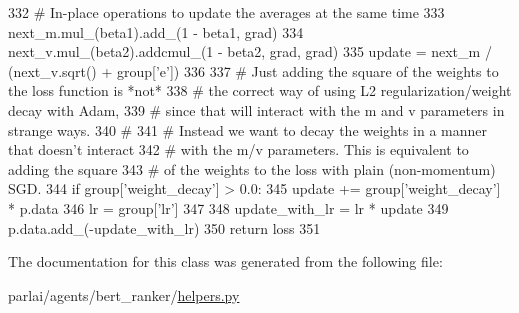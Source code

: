 \begin{DoxyCode}
332                 \textcolor{comment}{# In-place operations to update the averages at the same time}
333                 next\_m.mul\_(beta1).add\_(1 - beta1, grad)
334                 next\_v.mul\_(beta2).addcmul\_(1 - beta2, grad, grad)
335                 update = next\_m / (next\_v.sqrt() + group[\textcolor{stringliteral}{'e'}])
336 
337                 \textcolor{comment}{# Just adding the square of the weights to the loss function is *not*}
338                 \textcolor{comment}{# the correct way of using L2 regularization/weight decay with Adam,}
339                 \textcolor{comment}{# since that will interact with the m and v parameters in strange ways.}
340                 \textcolor{comment}{#}
341                 \textcolor{comment}{# Instead we want to decay the weights in a manner that doesn't interact}
342                 \textcolor{comment}{# with the m/v parameters. This is equivalent to adding the square}
343                 \textcolor{comment}{# of the weights to the loss with plain (non-momentum) SGD.}
344                 \textcolor{keywordflow}{if} group[\textcolor{stringliteral}{'weight\_decay'}] > 0.0:
345                     update += group[\textcolor{stringliteral}{'weight\_decay'}] * p.data
346                 lr = group[\textcolor{stringliteral}{'lr'}]
347 
348                 update\_with\_lr = lr * update
349                 p.data.add\_(-update\_with\_lr)
350         \textcolor{keywordflow}{return} loss
351 \end{DoxyCode}


The documentation for this class was generated from the following file\+:\begin{DoxyCompactItemize}
\item 
parlai/agents/bert\+\_\+ranker/\hyperlink{helpers_8py}{helpers.\+py}\end{DoxyCompactItemize}
